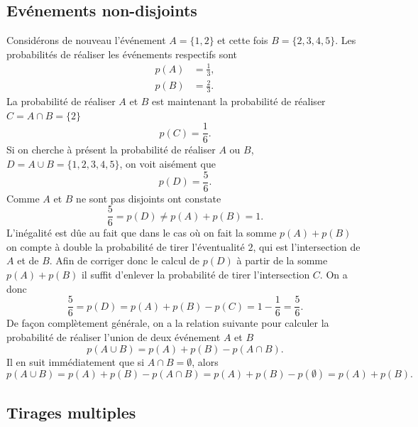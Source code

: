 \documentclass[a4paper,12pt]{book}
\begin{document}
\subsection{Evénements non-disjoints}
Considérons de nouveau l'événement $A=\{1,2\}$ et cette fois $B=\{2,3,4,5\}$. Les probabilités de réaliser les événements
respectifs sont
\begin{align}
 p(A)&=\frac{1}{3},\\
 p(B)&=\frac{2}{3}.
\end{align}
La probabilité de réaliser $A$ et $B$ est maintenant la probabilité de réaliser $C=A\cap B=\{2\}$ 
\begin{equation}
 p(C)=\frac{1}{6}.
\end{equation}
Si on cherche à présent la probabilité de réaliser $A$ ou $B$, $D=A\cup B=\{1,2,3,4,5\}$, on voit aisément que 
\begin{equation}
 p(D)=\frac{5}{6}.
\end{equation}
Comme $A$ et $B$ ne sont pas disjoints ont constate 
\begin{equation}
 \frac{5}{6}=p(D)\neq p(A)+p(B)=1.
\end{equation}
L'inégalité est dûe au fait que dans le cas où on fait la somme $p(A)+p(B)$ on compte à double la probabilité de tirer l'éventualité $2$,
qui est l'intersection de $A$ et de $B$. Afin de corriger donc le calcul de $p(D)$ à partir de la somme $p(A)+p(B)$ il suffit d'enlever 
la probabilité de tirer l'intersection $C$. On a donc
\begin{equation}
 \frac{5}{6}=p(D)= p(A)+p(B)-p(C)=1-\frac{1}{6}=\frac{5}{6}.
\end{equation}
De façon complètement générale, on a la relation suivante pour calculer la probabilité de réaliser l'union de deux événement $A$ et $B$
\begin{equation}
 p(A\cup B)=p(A)+p(B)-p(A\cap B).
\end{equation}
Il en suit immédiatement que si $A\cap B=\emptyset$, alors
\begin{equation}
 p(A\cup B)=p(A)+p(B)-p(A\cap B)=p(A)+p(B)-p(\emptyset)=p(A)+p(B).
\end{equation}

\subsection{Tirages multiples}
\end{document}
